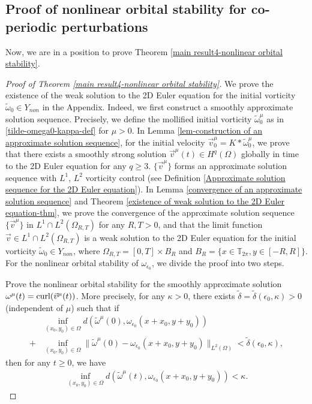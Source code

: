 \documentclass[1 [leqno, 11pt]{amsart}
\numberwithin{equation}{section}
\let\ep=\epsilon
\def\curl{\mathop{\rm curl}\nolimits}
\begin{document}
\begin{CJK*}{GBK}{song}
\subsection{Proof of nonlinear orbital stability for co-periodic perturbations}
Now, we are in a position to prove Theorem \ref{main result4-nonlinear orbital stability}.

\begin{proof}[Proof of  Theorem \ref{main result4-nonlinear orbital stability}]
We prove  the existence of the weak solution to the 2D Euler equation
for the initial vorticity $\tilde\omega_0\in  Y_{non}$ in the Appendix. Indeed, we first construct a smoothly approximate solution sequence. Precisely, we define the mollified initial vorticity $\tilde\omega_0^{\mu}$ as in  \eqref{tilde-omega0-kappa-def} for $\mu>0$. In  Lemma \ref{lem-construction of an approximate solution sequence},
for
the initial velocity $\vec{v}_0^{\mu}=K\ast\tilde\omega_0^{\mu}$,  we prove that  there exists  a  smoothly strong solution $\vec{v}^{\mu}(t)\in H^q(\Omega)$  globally in time   to the 2D Euler equation for any $q\geq3$.
$\{\vec{v}^{\mu}\}$ forms an approximate solution sequence with $L^1$, $L^2$ vorticity control (see Definition \ref{Approximate solution sequence for the 2D Euler equation}).
In Lemma \ref{convergence of an approximate solution sequence} and Theorem \ref{existence of weak solution to the 2D Euler equation-thm},
we prove the convergence of  the approximate solution sequence $\{\vec{v}^{\mu}\}$ in $L^1\cap L^2(\Omega_{R,T})$ for any $R, T>0$, and that the limit function  $\vec{v}\in L^1\cap L^2(\Omega_{R,T})$ is a weak solution to the 2D Euler equation
    for the initial vorticity $\tilde \omega_0\in Y_{non}$, where $\Omega_{R,T}= [0,T]\times B_R$ and $B_R=\{x\in\mathbb{T}_{2\pi},y\in[-R,R]\}$. For the nonlinear orbital stability of $\omega_{\ep_0}$,
we divide the  proof  into two steps.
\vspace{0.5mm}

 Prove the nonlinear orbital stability for the smoothly approximate solution $\omega^\mu(t)=\curl(\vec{v}^{\mu}(t))$. More precisely,
for any $\kappa>0$, there exists $\tilde\delta=\tilde\delta(\ep_0,\kappa)>0$ (independent of $\mu$) such that if
\begin{align}\nonumber&\inf_{(x_0,y_0)\in\Omega} d(\tilde \omega^\mu(0),\omega_{\ep_0}(x+x_0,y+y_0))\\
+&\inf_{(x_0,y_0)\in\Omega}\|\tilde \omega^\mu(0)-\omega_{\ep_0}(x+x_0,y+y_0)\|_{L^2(\Omega)}<\tilde\delta(\ep_0,\kappa),\label{initial-vorticity-app-small}
\end{align}
 then for any $t\geq0$, we have
\begin{align}\label{onlinear orbital stability-app}
\inf_{(x_0,y_0)\in\Omega}d(\tilde \omega^\mu(t),\omega_{\ep_0}(x+x_0,y+y_0))<\kappa.
\end{align}


\end{proof}
\end{CJK*}
\end{document}
